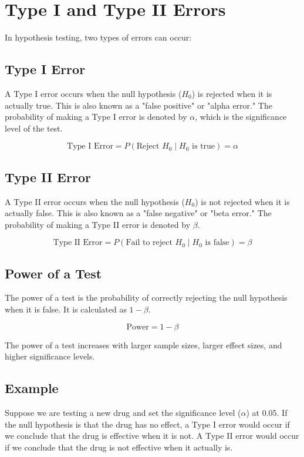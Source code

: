 \documentclass{article}
\begin{document}
\section{Type I and Type II Errors}
In hypothesis testing, two types of errors can occur:

\subsection{Type I Error}
A Type I error occurs when the null hypothesis (\(H_0\)) is rejected when it is actually true. This is also known as a "false positive" or "alpha error." The probability of making a Type I error is denoted by \(\alpha\), which is the significance level of the test.

\[
\text{Type I Error} = P(\text{Reject } H_0 \mid H_0 \text{ is true}) = \alpha
\]

\subsection{Type II Error}
A Type II error occurs when the null hypothesis (\(H_0\)) is not rejected when it is actually false. This is also known as a "false negative" or "beta error." The probability of making a Type II error is denoted by \(\beta\).

\[
\text{Type II Error} = P(\text{Fail to reject } H_0 \mid H_0 \text{ is false}) = \beta
\]

\subsection{Power of a Test}
The power of a test is the probability of correctly rejecting the null hypothesis when it is false. It is calculated as \(1 - \beta\).

\[
\text{Power} = 1 - \beta
\]

The power of a test increases with larger sample sizes, larger effect sizes, and higher significance levels.

\subsection{Example}
Suppose we are testing a new drug and set the significance level (\(\alpha\)) at 0.05. If the null hypothesis is that the drug has no effect, a Type I error would occur if we conclude that the drug is effective when it is not. A Type II error would occur if we conclude that the drug is not effective when it actually is.
\end{document}
